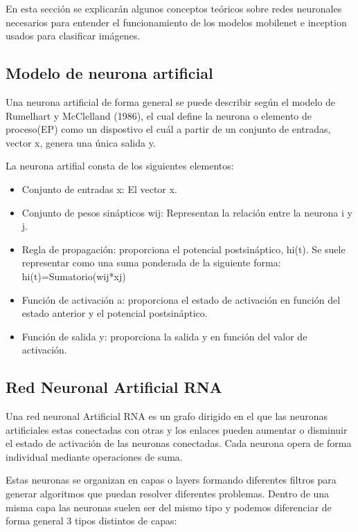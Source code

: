 En esta sección se explicarán algunos conceptos teóricos sobre redes neuronales necesarios para entender el funcionamiento de los modelos mobilenet e inception usados para clasificar imágenes.

\subsection{Modelo de neurona artificial}

Una neurona artificial de forma general se puede describir según el modelo de Rumelhart y McClelland (1986), el cual define la neurona o elemento de proceso(EP) como un dispostivo el cuál a partir de un conjunto de entradas, vector x, genera una única salida y.


La neurona artifial consta de los siguientes elementos:

\begin{itemize}
	\item{Conjunto de entradas x}: El vector x.
	\item{Conjunto de pesos sinápticos wij}: Representan la relación entre la neurona i y j.
	\item{Regla de propagación}: proporciona el potencial postsináptico, hi(t). Se suele representar como una suma ponderada de la siguiente forma:
	hi(t)=Sumatorio(wij*xj)
	\item{Función de activación a}: proporciona el estado de activación en función del estado anterior y el potencial postsináptico.
	\item{Función de salida y}: proporciona la salida y en función del valor de activación.
\end{itemize}

\subsection{Red Neuronal Artificial RNA}

Una red neuronal Artificial RNA es un grafo dirigido en el que las neuronas artificiales estas conectadas con otras y los enlaces pueden aumentar o disminuir el estado de activación de las neuronas conectadas. Cada neurona opera de forma individual mediante operaciones de suma.

Estas neuronas se organizan en capas o layers formando diferentes filtros para generar algoritmos que puedan resolver diferentes problemas. Dentro de una misma capa las neuronas suelen ser del mismo tipo y podemos diferenciar de forma general 3 tipos distintos de capas:

